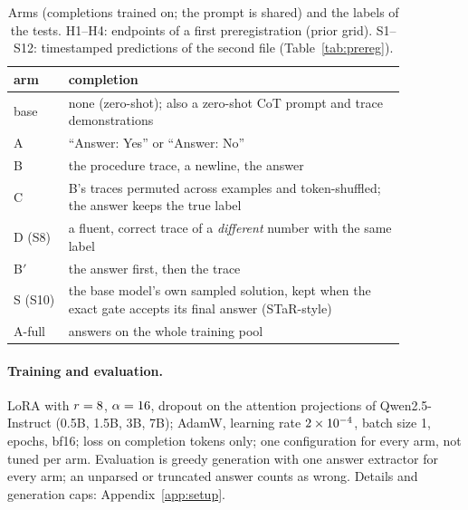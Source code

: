 \documentclass{article}
\theoremstyle{definition}
\begin{document}
\begin{table}[t]
\caption{Arms (completions trained on; the prompt is shared) and the labels of the tests. H1--H4: endpoints of a first preregistration (prior grid). S1--S12: timestamped predictions of the second file (Table~\ref{tab:prereg}).}
\label{tab:arms}
\centering\footnotesize\setlength{\tabcolsep}{4pt}
\begin{tabular}{@{}lp{0.86\linewidth}@{}}
\toprule
arm & completion \\
\midrule
base & none (zero-shot); also a zero-shot CoT prompt and \nShots{} trace demonstrations \\
A & ``Answer: Yes'' or ``Answer: No'' \\
B & the procedure trace, a newline, the answer \\
C & B's traces permuted across examples and token-shuffled; the answer keeps the true label \\
D (S8) & a fluent, correct trace of a \emph{different} number with the same label \\
B$'$ & the answer first, then the trace \\
S (S10) & the base model's own sampled solution, kept when the exact gate accepts its final answer (STaR-style) \\
A-full & answers on the whole training pool \\
\bottomrule
\end{tabular}
\end{table}

\paragraph{Training and evaluation.} LoRA \citep{hu2022lora} with $r=8$, $\alpha=16$, dropout \loraDropout{} on the attention projections of Qwen2.5-Instruct \citep{qwen2024qwen25} (0.5B, 1.5B, 3B, 7B); AdamW, learning rate $2\times 10^{-4}$, batch size 1, \nEpochs{} epochs, bf16; loss on completion tokens only; one configuration for every arm, not tuned per arm. Evaluation is greedy generation with one answer extractor for every arm; an unparsed or truncated answer counts as wrong. Details and generation caps: Appendix~\ref{app:setup}.
\end{document}
